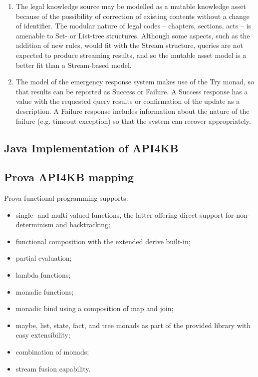 \documentclass[runningheads]{llncs}
\begin{document}
\begin{enumerate}
\item The legal knowledge source may be modelled as a mutable knowledge asset  because of the possibility of correction of existing contents without a change of identifier. The modular nature of legal codes -- chapters, sections, acts -- is amenable to Set- or List-tree structures. Although some aspects, such as the addition of new rules, would fit with the Stream structure, queries are not expected to produce streaming results, and so the mutable asset model is a better fit than a Stream-based model.

\item The model of the emergency response system makes use of the Try monad, so that results can be reported as Success or Failure. A Success response has a value with the requested query results or confirmation of the update as a description. A Failure response includes information about the nature of the failure (e.g. timeout exception) so that the system can recover appropriately.

\end{enumerate}

  

\subsection{Java Implementation of API4KB}



\subsection{Prova API4KB mapping}

Prova functional programming supports:

\begin{itemize}
  \item single- and multi-valued functions, the latter offering direct support for non-determinism and backtracking;
  \item functional composition with the extended derive built-in;
  \item partial evaluation;
  \item lambda functions;
  \item monadic functions;
  \item monadic bind using a composition of map and join;
  \item maybe, list, state, fact, and tree monads as part of the provided library with easy extensibility;
  \item combination of monads;
  \item stream fusion capability.
\end{itemize}
\end{document}
